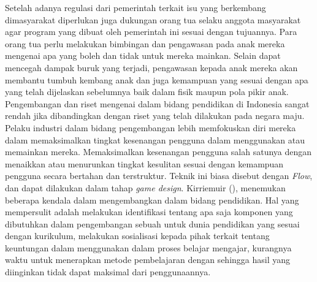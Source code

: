 Setelah adanya regulasi dari pemerintah terkait isu yang berkembang dimasyarakat diperlukan juga dukungan orang tua selaku anggota masyarakat agar program yang dibuat oleh pemerintah ini sesuai dengan tujuannya. Para orang tua perlu melakukan bimbingan dan pengawasan pada anak mereka mengenai \game apa yang boleh dan tidak untuk mereka mainkan. Selain dapat mencegah dampak buruk yang terjadi, pengawasan kepada anak mereka akan membantu tumbuh kembang anak dan juga kemampuan yang sesuai dengan apa yang telah dijelaskan sebelumnya baik dalam fisik maupun pola pikir anak.
\linebreak\linebreak
Pengembangan dan riset mengenai \game dalam bidang pendidikan di Indonesia sangat rendah jika dibandingkan dengan riset yang telah dilakukan pada negara maju. Pelaku industri dalam bidang pengembangan \game lebih memfokuskan diri mereka dalam memaksimalkan tingkat kesenangan pengguna dalam menggunakan atau memainkan \game mereka. Memaksimalkan kesenangan pengguna salah satunya dengan menaikkan atau menurunkan tingkat kesulitan sesuai dengan kemampuan pengguna secara bertahan dan terstruktur. Teknik ini biasa disebut dengan \textit{Flow}, dan dapat dilakukan dalam tahap \textit{game design}.
\linebreak\linebreak
Kirriemuir (\citeyear{paper.Kirriemuir}), menemukan beberapa kendala dalam mengembangkan \game dalam bidang pendidikan. Hal yang mempersulit adalah melakukan identifikasi tentang apa saja komponen yang dibutuhkan dalam pengembangan sebuah \game untuk dunia pendidikan yang sesuai dengan kurikulum, melakukan sosialisasi kepada pihak terkait tentang keuntungan dalam menggunakan \game dalam proses belajar mengajar, kurangnya waktu untuk menerapkan metode pembelajaran dengan \game sehingga hasil yang diinginkan tidak dapat maksimal dari penggunaannya.
\linebreak\linebreak



